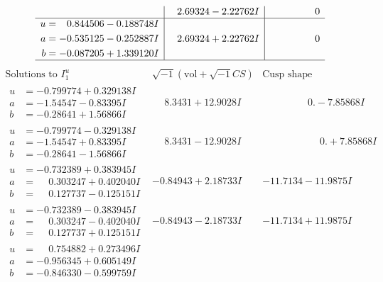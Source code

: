 \documentclass[1p]{elsarticle_modified}
\theoremstyle{definition}
\newcommand{\I}{\sqrt{-1}}
\begin{document}
$$\begin{array}{c|c|c}
 & \phantom{-}2.69324 - 2.22762 I & \phantom{-0.000000 } 0 \\ \hline\begin{aligned}
u &= \phantom{-}0.844506 - 0.188748 I \\
a &= -0.535125 - 0.252887 I \\
b &= -0.087205 + 1.339120 I\end{aligned}
 & \phantom{-}2.69324 + 2.22762 I & \phantom{-0.000000 } 0\\
 \hline 
 \end{array}$$\newpage$$\begin{array}{c|c|c}  
\text{Solutions to }I^u_{1}& \I (\text{vol} + \sqrt{-1}CS) & \text{Cusp shape}\\
 \hline 
\begin{aligned}
u &= -0.799774 + 0.329138 I \\
a &= -1.54547 - 0.83395 I \\
b &= -0.28641 + 1.56866 I\end{aligned}
 & \phantom{-}8.3431 + 12.9028 I & \phantom{-0.000000 } 0. - 7.85868 I \\ \hline\begin{aligned}
u &= -0.799774 - 0.329138 I \\
a &= -1.54547 + 0.83395 I \\
b &= -0.28641 - 1.56866 I\end{aligned}
 & \phantom{-}8.3431 - 12.9028 I & \phantom{-0.000000 -}0. + 7.85868 I \\ \hline\begin{aligned}
u &= -0.732389 + 0.383945 I \\
a &= \phantom{-}0.303247 + 0.402040 I \\
b &= \phantom{-}0.127737 - 0.125151 I\end{aligned}
 & -0.84943 + 2.18733 I & -11.7134 - 11.9875 I \\ \hline\begin{aligned}
u &= -0.732389 - 0.383945 I \\
a &= \phantom{-}0.303247 - 0.402040 I \\
b &= \phantom{-}0.127737 + 0.125151 I\end{aligned}
 & -0.84943 - 2.18733 I & -11.7134 + 11.9875 I \\ \hline\begin{aligned}
u &= \phantom{-}0.754882 + 0.273496 I \\
a &= -0.956345 + 0.605149 I \\
b &= -0.846330 - 0.599759 I\end{aligned}

\end{array}$$
\end{document}
